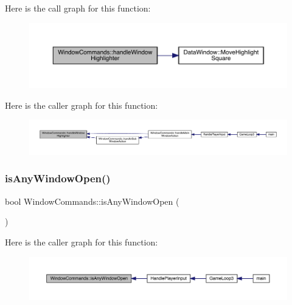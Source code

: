 Here is the call graph for this function\+:
\nopagebreak
\begin{figure}[H]
\begin{center}
\leavevmode
\includegraphics[width=350pt]{class_window_commands_a579bde80c82ababdcdbf271ccefd30b5_cgraph}
\end{center}
\end{figure}
Here is the caller graph for this function\+:
\nopagebreak
\begin{figure}[H]
\begin{center}
\leavevmode
\includegraphics[width=350pt]{class_window_commands_a579bde80c82ababdcdbf271ccefd30b5_icgraph}
\end{center}
\end{figure}
\mbox{\label{class_window_commands_a3a551cd38ac62e1644cef2f95d748bdd}} 
\subsubsection{\texorpdfstring{is\+Any\+Window\+Open()}{isAnyWindowOpen()}}
{\footnotesize\ttfamily bool Window\+Commands\+::is\+Any\+Window\+Open (\begin{DoxyParamCaption}{ }\end{DoxyParamCaption})}

Here is the caller graph for this function\+:
\nopagebreak
\begin{figure}[H]
\begin{center}
\leavevmode
\includegraphics[width=350pt]{class_window_commands_a3a551cd38ac62e1644cef2f95d748bdd_icgraph}
\end{center}
\end{figure}
\mbox{\label{class_window_commands_a4a688b109ea4eff83b5ae43bb1f93e50}} 
